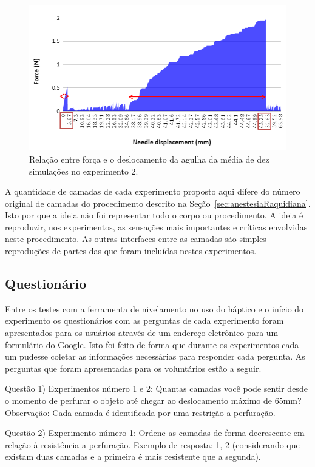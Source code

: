 \begin{figure}[ht!]
    \centering
    \includegraphics[width=0.8\linewidth]{capitulos/figuras/Experiment 2 - Force x Needle displacement - marked.PNG} 
    \caption{Relação entre força e o deslocamento da agulha da média de dez simulações no experimento 2.}
    \label{fig:forcaDeslocamentoExperimento2}
\end{figure}

A quantidade de camadas de cada experimento proposto aqui difere do número original de camadas do procedimento descrito na Seção~\ref{sec:anestesiaRaquidiana}. Isto por que a ideia não foi representar todo o corpo ou procedimento. A ideia é reproduzir, nos experimentos, as sensações mais importantes e críticas envolvidas neste procedimento. As outras interfaces entre as camadas são simples reproduções de partes das que foram incluídas nestes experimentos.

\subsection{Questionário}
\label{sec:questionario}

Entre os testes com a ferramenta de nivelamento no uso do háptico e o início do experimento os questionários com as perguntas de cada experimento foram apresentados para os usuários através de um endereço eletrônico para um formulário do Google. Isto foi feito de forma que durante os experimentos cada um pudesse coletar as informações necessárias para responder cada pergunta. As perguntas que foram apresentadas para os voluntários estão a seguir.

Questão 1) Experimentos número 1 e 2: Quantas camadas você pode sentir desde o momento de perfurar o objeto até chegar ao deslocamento máximo de 65mm? 
Observação: Cada camada é identificada por uma restrição a perfuração.

Questão 2) Experimento número 1: Ordene as camadas de forma decrescente em relação à resistência a perfuração.    
Exemplo de resposta: 1, 2 (considerando que existam duas camadas e a primeira é mais resistente que a segunda).

